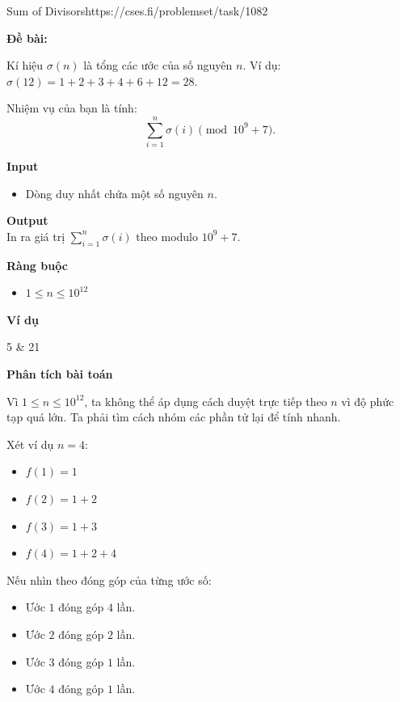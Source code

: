 \begin{baitap}{Sum of Divisors}{https://cses.fi/problemset/task/1082}

\textbf{Đề bài:}  

Kí hiệu $\sigma(n)$ là tổng các ước của số nguyên $n$.  
Ví dụ: $\sigma(12) = 1 + 2 + 3 + 4 + 6 + 12 = 28$.

Nhiệm vụ của bạn là tính:
\[
\sum_{i=1}^{n} \sigma(i) \pmod{10^9+7}.
\]

\textbf{Input}
\begin{itemize}[noitemsep]
    \item Dòng duy nhất chứa một số nguyên $n$.
\end{itemize}

\textbf{Output} \\
In ra giá trị $\sum_{i=1}^{n} \sigma(i)$ theo modulo $10^9+7$.

\textbf{Ràng buộc}
\begin{itemize}[noitemsep]
    \item $1 \le n \le 10^{12}$
\end{itemize}

\textbf{Ví dụ}

\begin{sampleio}
5 & 21 \\
\end{sampleio}

\end{baitap}

\textbf{Phân tích bài toán}  

Vì $1 \leq n \leq 10^{12}$, ta không thể áp dụng cách duyệt trực tiếp theo $n$ vì độ phức tạp quá lớn. Ta phải tìm cách nhóm các phần tử lại để tính nhanh.  

\medskip
Xét ví dụ $n=4$:  
\begin{itemize}
    \item $f(1) = 1$
    \item $f(2) = 1+2$
    \item $f(3) = 1+3$
    \item $f(4) = 1+2+4$
\end{itemize}

Nếu nhìn theo đóng góp của từng ước số:  
\begin{itemize}
    \item Ước $1$ đóng góp $4$ lần.
    \item Ước $2$ đóng góp $2$ lần.
    \item Ước $3$ đóng góp $1$ lần.
    \item Ước $4$ đóng góp $1$ lần.
\end{itemize}

